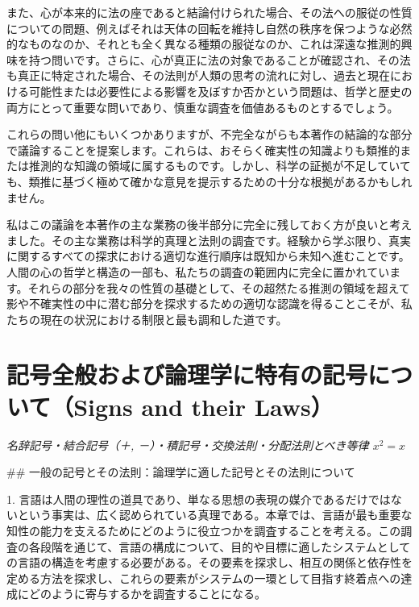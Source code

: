 \documentclass[a4paper,11pt,openany]{ltjsbook}
\begin{document}
また、心が本来的に法の座であると結論付けられた場合、その法への服従の性質についての問題、例えばそれは天体の回転を維持し自然の秩序を保つような必然的なものなのか、それとも全く異なる種類の服従なのか、これは深遠な推測的興味を持つ問いです。さらに、心が真正に法の対象であることが確認され、その法も真正に特定された場合、その法則が人類の思考の流れに対し、過去と現在における可能性または必要性による影響を及ぼすか否かという問題は、哲学と歴史の両方にとって重要な問いであり、慎重な調査を価値あるものとするでしょう。

これらの問い他にもいくつかありますが、不完全ながらも本著作の結論的な部分で議論することを提案します。これらは、おそらく確実性の知識よりも類推的または推測的な知識の領域に属するものです。しかし、科学の証拠が不足していても、類推に基づく極めて確かな意見を提示するための十分な根拠があるかもしれません。

私はこの議論を本著作の主な業務の後半部分に完全に残しておく方が良いと考えました。その主な業務は科学的真理と法則の調査です。経験から学ぶ限り、真実に関するすべての探求における適切な進行順序は既知から未知へ進むことです。人間の心の哲学と構造の一部も、私たちの調査の範囲内に完全に置かれています。それらの部分を我々の性質の基礎として、その超然たる推測の領域を超えて影や不確実性の中に潜む部分を探求するための適切な認識を得ることこそが、私たちの現在の状況における制限と最も調和した道です。

\newpage

\chapter{記号全般および論理学に特有の記号について（Signs and their Laws）}
\label{ch:ii}

\begin{center}
\large\textit{名辞記号・結合記号（＋, －）・積記号・交換法則・分配法則とべき等律 $x^2 = x$}
\end{center}
\vspace{4mm}

\#\# 一般の記号とその法則：論理学に適した記号とその法則について

1. 言語は人間の理性の道具であり、単なる思想の表現の媒介であるだけではないという事実は、広く認められている真理である。本章では、言語が最も重要な知性の能力を支えるためにどのように役立つかを調査することを考える。この調査の各段階を通じて、言語の構成について、目的や目標に適したシステムとしての言語の構造を考慮する必要がある。その要素を探求し、相互の関係と依存性を定める方法を探求し、これらの要素がシステムの一環として目指す終着点への達成にどのように寄与するかを調査することになる。
\end{document}
